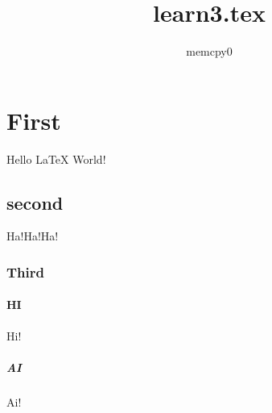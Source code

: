 \documentclass{article}
\author{memcpy0}
\title{learn3.tex}
\begin{document}
    \maketitle

    \section{First}
    Hello LaTeX World!
    \subsection{second}
    Ha!Ha!Ha!
    \subsubsection{Third}
    \paragraph{HI}
    Hi!
    \subparagraph{AI}
    Ai!
\end{document}
